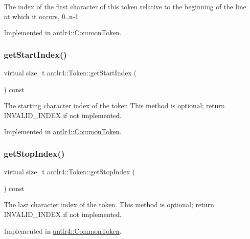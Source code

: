 The index of the first character of this token relative to the beginning of the line at which it occurs, 0..n-\/1 

Implemented in \hyperlink{classantlr4_1_1CommonToken_aa1d6ebf145f7eac65ac809f273fff0c7}{antlr4\+::\+Common\+Token}.

\mbox{\label{classantlr4_1_1Token_ab0baee45182ad985ba4a61e4a46ffe6a}} 
\subsubsection{\texorpdfstring{get\+Start\+Index()}{getStartIndex()}}
{\footnotesize\ttfamily virtual size\+\_\+t antlr4\+::\+Token\+::get\+Start\+Index (\begin{DoxyParamCaption}{ }\end{DoxyParamCaption}) const\hspace{0.3cm}{\ttfamily [pure virtual]}}

The starting character index of the token This method is optional; return I\+N\+V\+A\+L\+I\+D\+\_\+\+I\+N\+D\+EX if not implemented. 

Implemented in \hyperlink{classantlr4_1_1CommonToken_a6addf2e880a348bac29b68f8c919e4a5}{antlr4\+::\+Common\+Token}.

\mbox{\label{classantlr4_1_1Token_a813d966d66613c76f6af1e843a4b3359}} 
\subsubsection{\texorpdfstring{get\+Stop\+Index()}{getStopIndex()}}
{\footnotesize\ttfamily virtual size\+\_\+t antlr4\+::\+Token\+::get\+Stop\+Index (\begin{DoxyParamCaption}{ }\end{DoxyParamCaption}) const\hspace{0.3cm}{\ttfamily [pure virtual]}}

The last character index of the token. This method is optional; return I\+N\+V\+A\+L\+I\+D\+\_\+\+I\+N\+D\+EX if not implemented. 

Implemented in \hyperlink{classantlr4_1_1CommonToken_ad896be62187eb93d6f0e0e7930d7a500}{antlr4\+::\+Common\+Token}.

